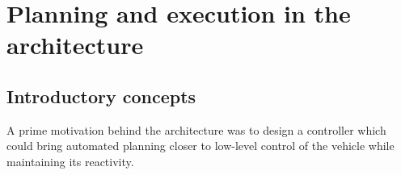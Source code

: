 \section{Planning and execution in the \rx architecture}
\label{sec:arch}


\subsection{Introductory concepts}
\label{sec:arch:intro}

A prime motivation behind the \rx architecture was to design a
controller which could bring automated planning closer to low-level
control of the vehicle while maintaining its reactivity. 

